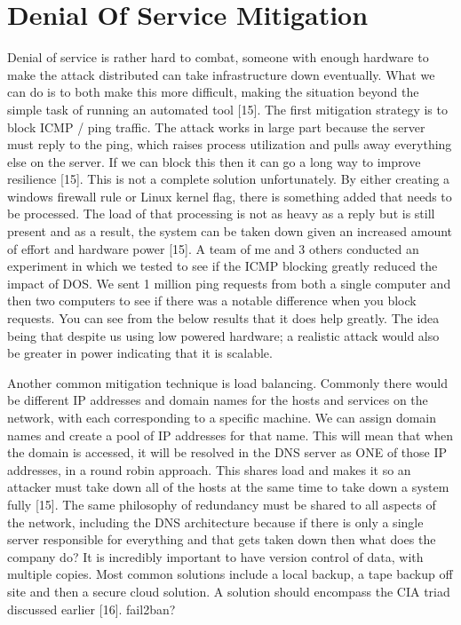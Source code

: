 \section {Denial Of Service Mitigation}
Denial of service is rather hard to combat, someone with enough hardware to make the attack distributed can take infrastructure down eventually. What we can do is to both make this more difficult, making the situation beyond the simple task of running an automated tool [15]. 
The first mitigation strategy is to block ICMP / ping traffic. The attack works in large part because the server must reply to the ping, which raises process utilization and pulls away everything else on the server. If we can block this then it can go a long way to improve resilience [15].
This is not a complete solution unfortunately. By either creating a windows firewall rule or Linux kernel flag, there is something added that needs to be processed. The load of that processing is not as heavy as a reply but is still present and as a result, the system can be taken down given an increased amount of effort and hardware power [15].
A team of me and 3 others conducted an experiment in which we tested to see if the ICMP blocking greatly reduced the impact of DOS. We sent 1 million ping requests from both a single computer and then two computers to see if there was a notable difference when you block requests. You can see from the below results that it does help greatly. The idea being that despite us using low powered hardware; a realistic attack would also be greater in power indicating that it is scalable.


Another common mitigation technique is load balancing. Commonly there would be different IP addresses and domain names for the hosts and services on the network, with each corresponding to a specific machine. We can assign domain names and create a pool of IP addresses for that name. This will mean that when the domain is accessed, it will be resolved in the DNS server as ONE of those IP addresses, in a round robin approach. This shares load and makes it so an attacker must take down all of the hosts at the same time to take down a system fully [15].
The same philosophy of redundancy must be shared to all aspects of the network, including the DNS architecture because if there is only a single server responsible for everything and that gets taken down then what does the company do? It is incredibly important to have version control of data, with multiple copies. Most common solutions include a local backup, a tape backup off site and then a secure cloud solution. A solution should encompass the CIA triad discussed earlier [16].
fail2ban?


